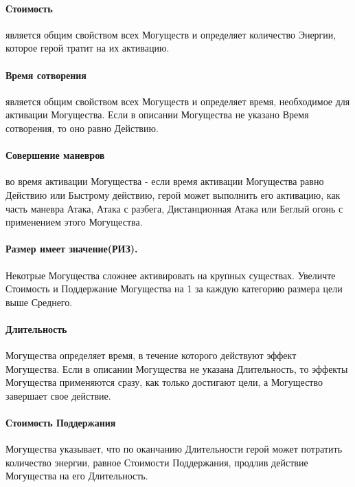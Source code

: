 \paragraph{Стоимость} является общим свойством всех Могуществ и определяет количество Энергии, которое герой тратит на их активацию.
\paragraph{Время сотворения} является общим свойством всех Могуществ и определяет время, необходимое для активации Могущества. Если в описании Могущества не указано Время сотворения, то оно равно Действию.
\paragraph{Совершение маневров} во время активации Могущества - если время активации Могущества равно Действию или Быстрому действию, герой может выполнить его активацию, как часть маневра Атака, Атака с разбега, Дистанционная Атака или Беглый огонь с применением этого Могущества.
\paragraph{Размер имеет значение(РИЗ).} Некотрые Могущества сложнее активировать на крупных существах. Увеличте Стоимость и Поддержание Могущества на 1 за каждую категорию размера цели выше Среднего.
\paragraph{Длительность} Могущества определяет время, в течение которого действуют эффект Могущества. Если в описании Могущества не указана Длительность, то эффекты Могущества применяются сразу, как только достигают цели, а Могущество завершает свое действие.
\paragraph{Стоимость Поддержания} Могущества указывает, что по оканчанию Длительности герой может потратить количество энергии, равное Стоимости Поддержания, продлив действие Могущества на его Длительность.
